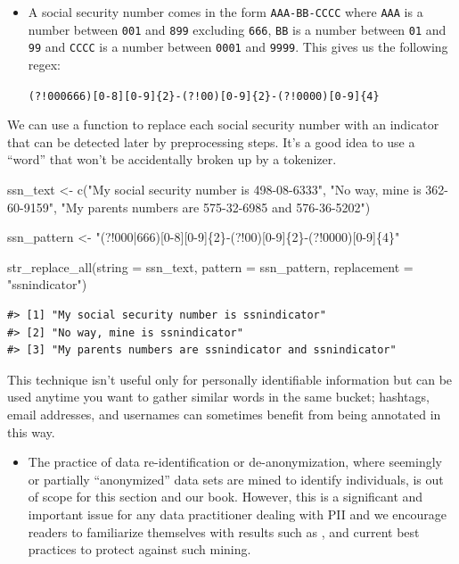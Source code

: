\documentclass[
]{krantz}
\makeatletter
\newenvironment{Shaded}{\begin{snugshade}}{\end{snugshade}}
\newcommand{\AttributeTok}[1]{\textcolor[rgb]{0.77,0.63,0.00}{#1}}
\newcommand{\FunctionTok}[1]{\textcolor[rgb]{0.00,0.00,0.00}{#1}}
\newcommand{\NormalTok}[1]{#1}
\newcommand{\OtherTok}[1]{\textcolor[rgb]{0.56,0.35,0.01}{#1}}
\newcommand{\StringTok}[1]{\textcolor[rgb]{0.31,0.60,0.02}{#1}}
\newenvironment{kframe}{%
\medskip{}
\setlength{\fboxsep}{.8em}
 \def\at@end@of@kframe{}%
 \ifinner\ifhmode%
  \def\at@end@of@kframe{\end{minipage}}%
  \begin{minipage}{\columnwidth}%
 \fi\fi%
 \def\FrameCommand##1{\hskip\@totalleftmargin \hskip-\fboxsep
 \colorbox{shadecolor}{##1}\hskip-\fboxsep
     \hskip-\linewidth \hskip-\@totalleftmargin \hskip\columnwidth}%
 \MakeFramed {\advance\hsize-\width
   \@totalleftmargin\z@ \linewidth\hsize
   \@setminipage}}%
 {\par\unskip\endMakeFramed%
 \at@end@of@kframe}
\renewenvironment{Shaded}{\begin{kframe}}{\end{kframe}}
\newenvironment{rmdblock}[1]
  {\begin{shaded*}
  \begin{itemize}[left = -1cm, labelsep = 1cm]
  \renewcommand{\labelitemi}{
    \raisebox{-.7\height}[0pt][0pt]{
      {\setkeys{Gin}{width=3em,keepaspectratio}\texttt{[image: images/\#1]}}
    }
  }
 
  \item
  }
  {
  \end{itemize}
  \end{shaded*}
  }
\newenvironment{rmdnote}
  {\begin{rmdblock}{note}}
  {\end{rmdblock}}
\newenvironment{rmdwarning}
  {\begin{rmdblock}{warning}}
  {\end{rmdblock}}
\makeatother
\begin{document}
\begin{rmdnote}
A social security number comes in the form \texttt{AAA-BB-CCCC} where
\texttt{AAA} is a number between \texttt{001} and \texttt{899} excluding
\texttt{666}, \texttt{BB} is a number between \texttt{01} and
\texttt{99} and \texttt{CCCC} is a number between \texttt{0001} and
\texttt{9999}. This gives us the following regex:

\texttt{(?!000\textbar{}666){[}0-8{]}{[}0-9{]}\{2\}-(?!00){[}0-9{]}\{2\}-(?!0000){[}0-9{]}\{4\}}
\end{rmdnote}

We can use a function to replace each social security number with an indicator that can be detected later by preprocessing steps.
It's a good idea to use a ``word'' that won't be accidentally broken up by a tokenizer.

\begin{Shaded}
\begin{Highlighting}[]
\NormalTok{ssn\_text }\OtherTok{\textless{}{-}} \FunctionTok{c}\NormalTok{(}\StringTok{"My social security number is 498{-}08{-}6333"}\NormalTok{,}
              \StringTok{"No way, mine is 362{-}60{-}9159"}\NormalTok{,}
              \StringTok{"My parents numbers are 575{-}32{-}6985 and 576{-}36{-}5202"}\NormalTok{)}

\NormalTok{ssn\_pattern }\OtherTok{\textless{}{-}}  \StringTok{"(?!000|666)[0{-}8][0{-}9]\{2\}{-}(?!00)[0{-}9]\{2\}{-}(?!0000)[0{-}9]\{4\}"}

\FunctionTok{str\_replace\_all}\NormalTok{(}\AttributeTok{string =}\NormalTok{ ssn\_text,}
                \AttributeTok{pattern =}\NormalTok{ ssn\_pattern,}
                \AttributeTok{replacement =} \StringTok{"ssnindicator"}\NormalTok{)}
\end{Highlighting}
\end{Shaded}

\begin{verbatim}
#> [1] "My social security number is ssnindicator"           
#> [2] "No way, mine is ssnindicator"                        
#> [3] "My parents numbers are ssnindicator and ssnindicator"
\end{verbatim}

This technique isn't useful only for personally identifiable information but can be used anytime you want to gather similar words in the same bucket; hashtags, email addresses, and usernames can sometimes benefit from being annotated in this way.

\begin{rmdwarning}
The practice of data re-identification or de-anonymization, where seemingly or partially ``anonymized'' data sets are mined to identify individuals, is out of scope for this section and our book. However, this is a significant and important issue for any data practitioner dealing with PII and we encourage readers to familiarize themselves with results such as \citet{Sweeney2000}, and current best practices to protect against such mining.
\end{rmdwarning}
\end{document}
